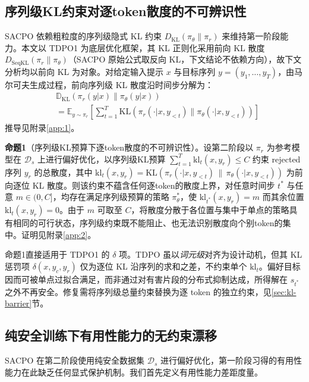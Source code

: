 \documentclass[lettersize,journal]{IEEEtran}
\begin{document}
\subsection{序列级KL约束对逐token散度的不可辨识性}\label{prop1}
SACPO 依赖粗粒度的序列级隐式 KL 约束 $D_{\text{KL}}(\pi_\theta \| \pi_r)$ 来维持第一阶段能力。本文以 TDPO1 为底层优化框架，其 KL 正则化采用前向 KL 散度 $D_{\text{SeqKL}}(\pi_r \| \pi_\theta)$（SACPO 原始公式取反向 KL，下文结论不依赖方向），故下文分析均以前向 KL 为对象。对给定输入提示 $x$ 与目标序列 $y = (y_1, \dots, y_T)$，由马尔可夫生成过程，前向序列级 KL 散度沿时间步分解为：
\begin{equation}
\begin{aligned}
    &\mathbb{D}_{\text{KL}}(\pi_r(y|x) \| \pi_\theta(y|x)) \\
    &= \mathbb{E}_{y \sim \pi_r} \left[ \sum_{t=1}^T \text{KL} \left( \pi_r(\cdot|x, y_{<t}) \| \pi_\theta(\cdot|x, y_{<t}) \right) \right]
\end{aligned}
\end{equation}
推导见附录\ref{app:1}。

\textbf{命题1}（序列级KL预算下逐token散度的不可辨识性）。设第二阶段以 $\pi_r$ 为参考模型在 $\mathcal{D}_s$ 上进行偏好优化，以序列级KL预算 $\sum_{t=1}^{T} \mathrm{kl}_t(x, y_r) \le C$ 约束 rejected 序列 $y_r$ 的总散度，其中 $\mathrm{kl}_t(x, y_r) = \mathrm{KL}(\pi_r(\cdot|x, y_{<t}) \,\|\, \pi_\theta(\cdot|x, y_{<t}))$ 为前向逐位 KL 散度。则该约束不蕴含任何逐token的散度上界，对任意时间步 $t^*$ 与任意 $m \in (0, C]$，均存在满足序列级预算的策略 $\pi_\theta^*$，使 $\mathrm{kl}_{t^*}(x, y_r) = m$ 而其余位置 $\mathrm{kl}_t(x, y_r) = 0$。由于 $m$ 可取至 $C$，将散度分散于各位置与集中于单点的策略具有相同的可行状态，序列级约束既不能阻止、也无法识别散度向个别token的集中。证明见附录\ref{app:2}。

命题1直接适用于 TDPO1 的 $\delta$ 项。TDPO 虽以\textit{词元级}对齐为设计动机，但其 KL 惩罚项 $\delta(x, y_c, y_r)$ 仅为逐位 KL 沿序列的求和之差，不约束单个 $\mathrm{kl}_t$。偏好目标因而可被单点过拟合满足，而非通过对有害片段的分布式抑制达成，所得解在 $s_{t^*}$ 之外不再安全。修复需将序列级总量约束替换为逐 token 的独立约束，见\ref{sec:kl-barrier}节。

\subsection{纯安全训练下有用性能力的无约束漂移}\label{prop2}
SACPO 在第二阶段使用纯安全数据集 $\mathcal{D}_s$ 进行偏好优化，第一阶段习得的有用性能力在此缺乏任何显式保护机制。我们首先定义有用性能力差距度量。
\end{document}
